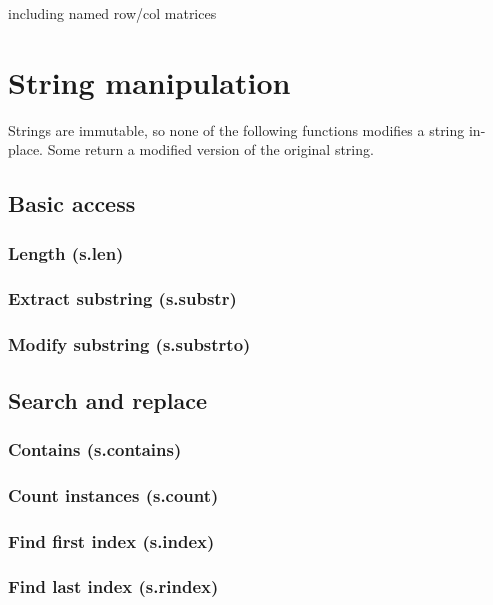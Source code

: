 \documentclass{article}
\theoremstyle{definition}
\begin{document}
including named row/col matrices

\pagebreak

\section{String manipulation}

Strings are immutable, so none of the following functions modifies a string in-place.  Some return a modified version of the original string.

\subsection{Basic access}

\subsubsection{Length (s.len)}

\subsubsection{Extract substring (s.substr)}

\subsubsection{Modify substring (s.substrto)}

\subsection{Search and replace}

\subsubsection{Contains (s.contains)}

\subsubsection{Count instances (s.count)}

\subsubsection{Find first index (s.index)}

\subsubsection{Find last index (s.rindex)}
\end{document}
